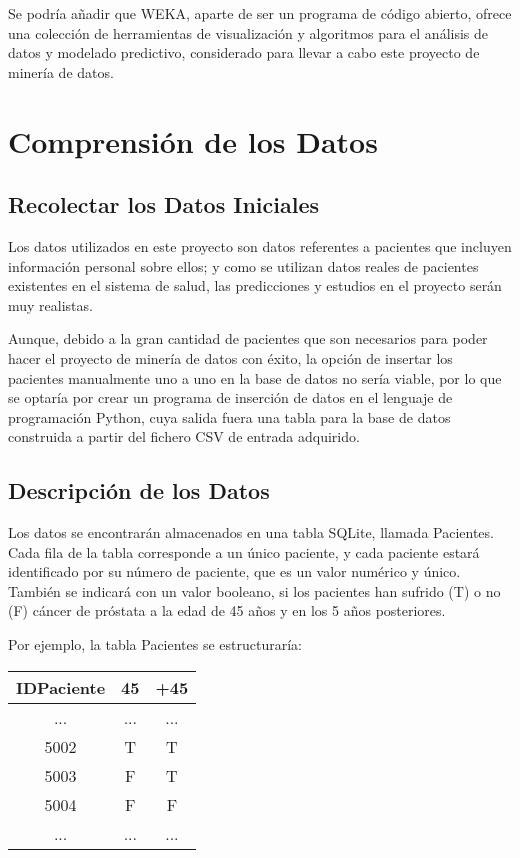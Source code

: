 \documentclass{article}
\begin{document}
Se podría añadir que WEKA, aparte de ser un programa de código abierto, ofrece una colección de herramientas de visualización y algoritmos para el análisis de datos y modelado predictivo, considerado para llevar a cabo este proyecto de minería de datos.  

\section{Comprensión de los Datos}

\subsection{Recolectar los Datos Iniciales}
Los datos utilizados en este proyecto son datos referentes a pacientes que incluyen información personal sobre ellos; y como se utilizan datos reales de pacientes existentes en el sistema de salud, las predicciones y estudios en el proyecto serán muy realistas.

Aunque, debido a la gran cantidad de pacientes que son necesarios para poder hacer el proyecto de minería de datos con éxito, la opción de insertar los pacientes manualmente uno a uno en la base de datos no sería viable, por lo que se optaría por crear un programa de inserción de datos en el lenguaje de programación Python, cuya salida fuera una tabla para la base de datos construida a partir del fichero CSV de entrada adquirido.

\subsection{Descripción de los Datos}
Los datos se encontrarán almacenados en una tabla SQLite, llamada Pacientes. Cada fila de la tabla corresponde a un único paciente, y cada paciente estará identificado por su número de paciente, que es un valor numérico y único. También se indicará con un valor booleano, si los pacientes han sufrido (T) o no (F) cáncer de próstata a la edad de 45 años y en los 5 años posteriores.

Por ejemplo, la tabla Pacientes se estructuraría:

\begin{center}
	\begin{tabular}{ |c|c|c| } 
		\hline
		IDPaciente & 45 & +45 \\
		\hline
		... & ... & ... \\ 
		5002 & T & T\\ 
		5003 & F & T\\ 
		5004 & F & F\\
		... & ... & ... \\ 
		\hline
\end{tabular}
\end{center}
\end{document}
